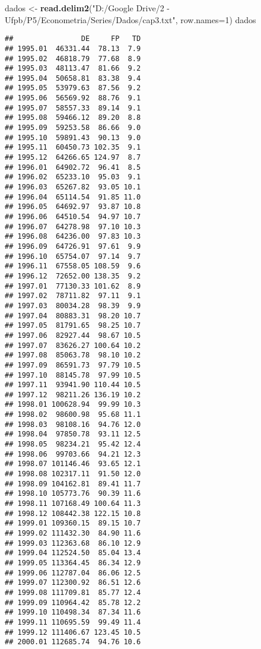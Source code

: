 \documentclass[]{article}
\title{}
\author{}
\date{}
\newenvironment{Shaded}{\begin{snugshade}}{\end{snugshade}}
\newcommand{\DataTypeTok}[1]{\textcolor[rgb]{0.13,0.29,0.53}{#1}}
\newcommand{\DecValTok}[1]{\textcolor[rgb]{0.00,0.00,0.81}{#1}}
\newcommand{\KeywordTok}[1]{\textcolor[rgb]{0.13,0.29,0.53}{\textbf{#1}}}
\newcommand{\NormalTok}[1]{#1}
\newcommand{\StringTok}[1]{\textcolor[rgb]{0.31,0.60,0.02}{#1}}
\begin{document}
\begin{Shaded}
\begin{Highlighting}[]
\NormalTok{dados <-}\StringTok{ }\KeywordTok{read.delim2}\NormalTok{(}\StringTok{"D:/Google Drive/2 - Ufpb/P5/Econometria/Series/Dados/cap3.txt"}\NormalTok{, }\DataTypeTok{row.names=}\DecValTok{1}\NormalTok{)}
\NormalTok{dados}
\end{Highlighting}
\end{Shaded}

\begin{verbatim}
##                DE     FP   TD
## 1995.01  46331.44  78.13  7.9
## 1995.02  46818.79  77.68  8.9
## 1995.03  48113.47  81.66  9.2
## 1995.04  50658.81  83.38  9.4
## 1995.05  53979.63  87.56  9.2
## 1995.06  56569.92  88.76  9.1
## 1995.07  58557.33  89.14  9.1
## 1995.08  59466.12  89.20  8.8
## 1995.09  59253.58  86.66  9.0
## 1995.10  59891.43  90.13  9.0
## 1995.11  60450.73 102.35  9.1
## 1995.12  64266.65 124.97  8.7
## 1996.01  64902.72  96.41  8.5
## 1996.02  65233.10  95.03  9.1
## 1996.03  65267.82  93.05 10.1
## 1996.04  65114.54  91.85 11.0
## 1996.05  64692.97  93.87 10.8
## 1996.06  64510.54  94.97 10.7
## 1996.07  64278.98  97.10 10.3
## 1996.08  64236.00  97.83 10.3
## 1996.09  64726.91  97.61  9.9
## 1996.10  65754.07  97.14  9.7
## 1996.11  67558.05 108.59  9.6
## 1996.12  72652.00 138.35  9.2
## 1997.01  77130.33 101.62  8.9
## 1997.02  78711.82  97.11  9.1
## 1997.03  80034.28  98.39  9.9
## 1997.04  80883.31  98.20 10.7
## 1997.05  81791.65  98.25 10.7
## 1997.06  82927.44  98.67 10.5
## 1997.07  83626.27 100.64 10.2
## 1997.08  85063.78  98.10 10.2
## 1997.09  86591.73  97.79 10.5
## 1997.10  88145.78  97.99 10.5
## 1997.11  93941.90 110.44 10.5
## 1997.12  98211.26 136.19 10.2
## 1998.01 100628.94  99.99 10.3
## 1998.02  98600.98  95.68 11.1
## 1998.03  98108.16  94.76 12.0
## 1998.04  97850.78  93.11 12.5
## 1998.05  98234.21  95.42 12.4
## 1998.06  99703.66  94.21 12.3
## 1998.07 101146.46  93.65 12.1
## 1998.08 102317.11  91.50 12.0
## 1998.09 104162.81  89.41 11.7
## 1998.10 105773.76  90.39 11.6
## 1998.11 107168.49 100.64 11.3
## 1998.12 108442.38 122.15 10.8
## 1999.01 109360.15  89.15 10.7
## 1999.02 111432.30  84.90 11.6
## 1999.03 112363.68  86.10 12.9
## 1999.04 112524.50  85.04 13.4
## 1999.05 113364.45  86.34 12.9
## 1999.06 112787.04  86.06 12.5
## 1999.07 112300.92  86.51 12.6
## 1999.08 111709.81  85.77 12.4
## 1999.09 110964.42  85.78 12.2
## 1999.10 110498.34  87.34 11.6
## 1999.11 110695.59  99.49 11.4
## 1999.12 111406.67 123.45 10.5
## 2000.01 112685.74  94.76 10.6

\end{verbatim}
\end{document}

